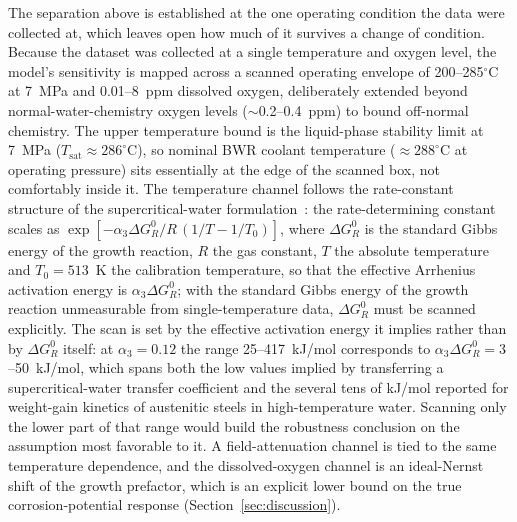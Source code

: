 \documentclass[a4paper,fleqn]{cas-sc}
\begin{document}
The separation above is established at the one operating condition the
data were collected at, which leaves open how much of it survives a
change of condition. Because the dataset was collected at a single
temperature and oxygen level, the model's sensitivity is mapped across a
scanned operating envelope of 200--285$^\circ$C at 7~MPa and 0.01--8~ppm
dissolved oxygen, deliberately extended beyond normal-water-chemistry
oxygen levels ($\sim$0.2--0.4~ppm) to bound off-normal chemistry. The
upper temperature bound is the liquid-phase stability limit at 7~MPa
($T_\text{sat} \approx 286^\circ$C), so nominal BWR coolant temperature
($\approx 288^\circ$C at operating pressure) sits essentially at the
edge of the scanned box, not comfortably inside it. The temperature
channel follows the rate-constant structure of the supercritical-water
formulation~\citep{li2020scwpdm}: the rate-determining constant scales
as $\exp[-\alpha_3 \Delta G^0_R/R\,(1/T - 1/T_0)]$, where $\Delta G^0_R$
is the standard Gibbs energy of the growth reaction, $R$ the gas
constant, $T$ the absolute temperature and $T_0 = 513$~K the calibration
temperature, so that the effective Arrhenius activation energy is
$\alpha_3 \Delta G^0_R$; with the standard Gibbs energy of the growth
reaction unmeasurable from single-temperature data, $\Delta G^0_R$ must
be scanned explicitly. The scan is set by the effective activation
energy it implies rather than by $\Delta G^0_R$ itself: at $\alpha_3 =
0.12$ the range 25--417~kJ/mol corresponds to $\alpha_3 \Delta G^0_R =
3$--50~kJ/mol, which spans both the low values implied by transferring a
supercritical-water transfer coefficient and the several tens of kJ/mol
reported for weight-gain kinetics of austenitic steels in
high-temperature water. Scanning only the lower part of that range would
build the robustness conclusion on the assumption most favorable to it.
A field-attenuation channel is tied to the same temperature dependence,
and the dissolved-oxygen channel is an ideal-Nernst shift of the growth
prefactor, which is an explicit lower bound on the true
corrosion-potential response (Section~\ref{sec:discussion}).
\end{document}

